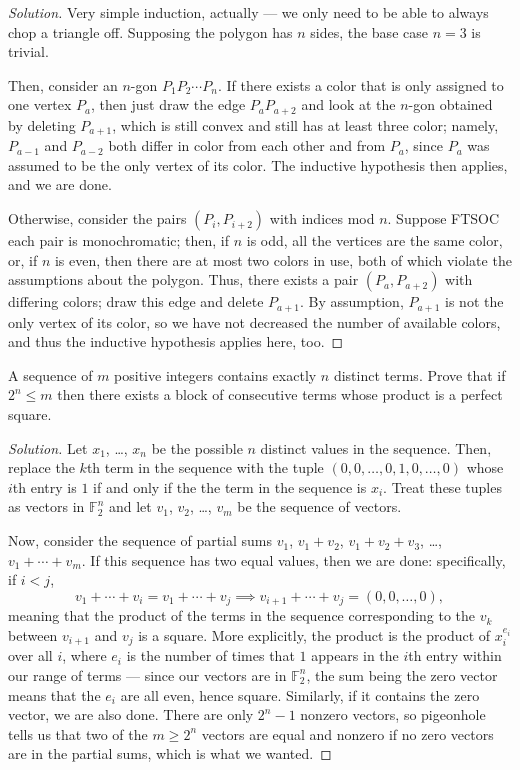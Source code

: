 \documentclass[11pt]{scrartcl}
\providecommand{\FF}{\mathbb F}
\newenvironment{soln}{\begin{proof}[Solution]}{\end{proof}}
\begin{document}
\begin{soln}
	Very simple induction, actually --- we only need to be able to
	always chop a triangle off. Supposing the polygon has $n$ sides,
	the base case $n=3$ is trivial.
	
	Then, consider an $n$-gon $P_1P_2\cdots P_n$.
	If there exists a color that is only assigned to one vertex $P_a$,
	then just draw the edge $P_aP_{a+2}$ and look at the $n$-gon
	obtained by deleting $P_{a+1}$, which is still convex
	and still has at least three color; namely, $P_{a-1}$
	and $P_{a-2}$ both differ in color from each other and from $P_a$,
	since $P_a$ was assumed to be the only vertex of its color.
	The inductive hypothesis then applies, and we are done.
	
	Otherwise, consider the pairs
	$(P_i, P_{i+2})$ with indices mod $n$. Suppose FTSOC each pair
	is monochromatic; then, if $n$ is odd, all the vertices are the same color,
	or, if $n$ is even, then there are at most two colors in use,
	both of which violate the assumptions about the polygon.
	Thus, there exists a pair $(P_a, P_{a+2})$ with differing colors;
	draw this edge and delete $P_{a+1}$. By assumption,
	$P_{a+1}$ is not the only vertex of its color, so we have not
	decreased the number of available colors,
	and thus the inductive hypothesis applies here, too.
\end{soln}

\begin{problem}
	A sequence of $m$ positive integers contains exactly $n$ distinct terms.
	Prove that if $2^n\le m$ then there exists a block of consecutive terms
	whose product is a perfect square.
\end{problem}

\begin{soln}
	Let $x_1$, \dots, $x_n$ be the possible $n$ distinct values in the sequence.
	Then, replace the $k$th term in the sequence with the tuple
	$(0, 0, \dots, 0, 1, 0, \dots, 0)$ whose $i$th entry is $1$
	if and only if the the term in the sequence is $x_i$.
	Treat these tuples as vectors in $\FF_2^n$
	and let $v_1$, $v_2$, \dots, $v_m$ be the sequence of vectors.
	
	Now, consider the sequence of partial sums
	$v_1$, $v_1 + v_2$, $v_1 + v_2 + v_3$, \dots, $v_1 + \cdots + v_m$.
	If this sequence has two equal values, then we are done:
	specifically, if $i < j$,
	\[v_1 + \cdots + v_i = v_1 + \cdots + v_j \implies
	v_{i+1} + \cdots + v_j = (0, 0, \dots, 0),\]
	meaning that the product of the terms in the sequence corresponding to the
	$v_k$ between $v_{i+1}$ and $v_j$ is a square.
	More explicitly, the product is the product of $x_i^{e_i}$
	over all $i$, where $e_i$ is the number of times
	that $1$ appears in the $i$th entry within our range of terms ---
	since our vectors are in $\FF_2^n$, the sum being the zero vector
	means that the $e_i$ are all even, hence square.
	Similarly, if it contains the zero vector, we are also done.
	There are only $2^n - 1$ nonzero vectors,
	so pigeonhole tells us that two of the $m\ge 2^n$ vectors are
	equal and nonzero if no zero vectors are in the partial sums,
	which is what we wanted.
\end{soln}
\end{document}
